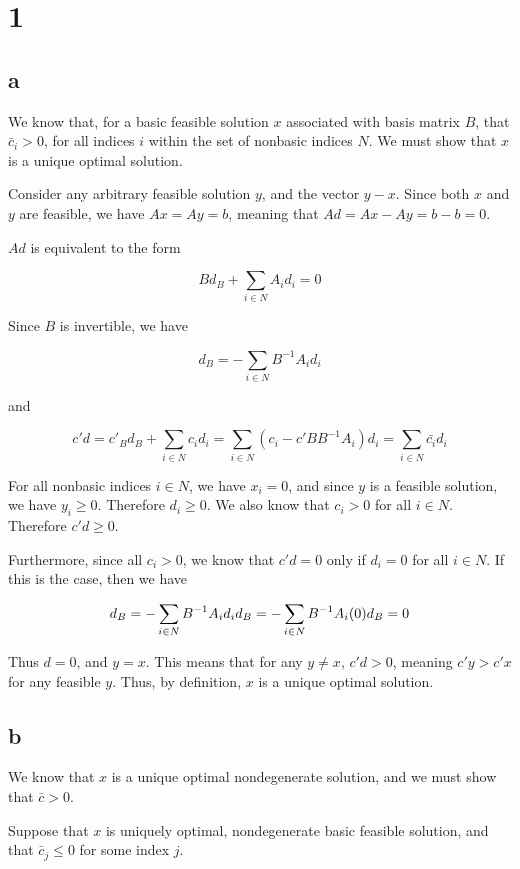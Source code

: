 \documentclass[11pt,a4paper]{article}
\begin{document}
\section{1}
\subsection{a}
We know that, for a basic feasible solution $x$ associated with basis matrix $B$, that $\bar{c}_i>0$, for all indices $i$ within the set of nonbasic indices $N$. We must show that $x$ is a unique optimal solution.

Consider any arbitrary feasible solution $y$, and the vector $y-x$. Since both $x$ and $y$ are feasible, we have $Ax=Ay=b$, meaning that $Ad=Ax-Ay=b-b=0$.

$Ad$ is equivalent to the form

$$
Bd_B + \sum_{i\in N} A_id_i=0
$$

Since $B$ is invertible, we have 

$$
d_B = -\sum_{i\in N}B^{-1}A_id_i
$$

and

$$
c'd=c'_Bd_B + \sum_{i\in N}c_id_i=\sum_{i\in N}(c_i-c'BB^{-1}A_i)d_i=\sum_{i\in N}\bar{c_i}d_i
$$

For all nonbasic indices $i\in N$, we have $x_i=0$, and since $y$ is a feasible solution, we have $y_i\geq 0$. Therefore $d_i\geq 0$. We also know that $c_i>0$ for all $i\in N$. Therefore $c'd\geq 0$. 

Furthermore, since all $c_i>0$, we know that $c'd=0$ only if $d_i=0$ for all $i\in N$. If this is the case, then we have 

$$
d_B=-\sum_{i\in N} B^{-1}A_id_i\\
d_B=-\sum_{i\in N} B^{-1}A_i(0)\\
d_B=0
$$

Thus $d=0$, and $y=x$. This means that for any $y\neq x$, $c'd>0$, meaning $c'y>c'x$ for any feasible $y$. Thus, by definition, $x$ is a unique optimal solution.

\subsection{b}

We know that $x$ is a unique optimal nondegenerate solution, and we must show that $\bar{c}>0$.

Suppose that $x$ is uniquely optimal, nondegenerate basic feasible solution, and that $\bar{c}_j\leq 0$ for some index $j$.
\end{document}
